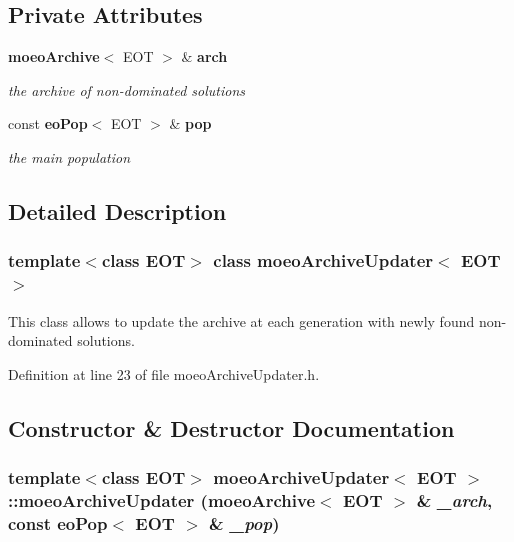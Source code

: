 \subsection*{Private Attributes}
\begin{CompactItemize}
\item 
{\bf moeo\-Archive}$<$ EOT $>$ \& {\bf arch}\label{classmoeoArchiveUpdater_2fd7b92786ced836e3d0b5abfb801a86}

\begin{CompactList}\small\item\em the archive of non-dominated solutions \item\end{CompactList}\item 
const {\bf eo\-Pop}$<$ EOT $>$ \& {\bf pop}\label{classmoeoArchiveUpdater_0fc3f08f0385c55569eb056737303363}

\begin{CompactList}\small\item\em the main population \item\end{CompactList}\end{CompactItemize}


\subsection{Detailed Description}
\subsubsection*{template$<$class EOT$>$ class moeo\-Archive\-Updater$<$ EOT $>$}

This class allows to update the archive at each generation with newly found non-dominated solutions. 



Definition at line 23 of file moeo\-Archive\-Updater.h.

\subsection{Constructor \& Destructor Documentation}
\subsubsection{\setlength{\rightskip}{0pt plus 5cm}template$<$class EOT$>$ {\bf moeo\-Archive\-Updater}$<$ EOT $>$::{\bf moeo\-Archive\-Updater} ({\bf moeo\-Archive}$<$ EOT $>$ \& {\em \_\-arch}, const {\bf eo\-Pop}$<$ EOT $>$ \& {\em \_\-pop})\hspace{0.3cm}{\tt  [inline]}}\label{classmoeoArchiveUpdater_71027fd5f8dac7d8069b682c998c03c5}


